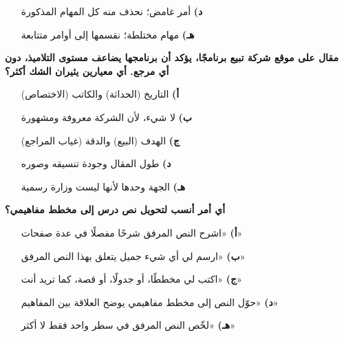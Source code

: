 \documentclass[11pt,a4paper]{article}
\begin{document}
\begin{multicols}{2}
\begin{minipage}{\linewidth}
\begin{itemize}[leftmargin=0.95cm, labelsep=4pt, itemsep=0pt, topsep=2pt, parsep=0pt]
  \item[\textbf{د)}] أمر غامض؛ نحذف منه كل المهام المذكورة
  \item[\textbf{هـ)}] مهام مختلطة؛ نقسمها إلى أوامر متتابعة
\end{itemize}
\end{minipage}\par\vspace{7pt plus 4pt}
\noindent\begin{minipage}{\linewidth}
\hangindent=0.7cm\textbf{مقال على موقع شركة تبيع برنامجًا، يؤكد أن برنامجها يضاعف مستوى التلاميذ، دون أي مرجع. أي معيارين يثيران الشك أكثر؟}
\begin{itemize}[leftmargin=0.95cm, labelsep=4pt, itemsep=0pt, topsep=2pt, parsep=0pt]
  \item[\textbf{أ)}] التاريخ (الحداثة) والكاتب (الاختصاص)
  \item[\textbf{ب)}] لا شيء، لأن الشركة معروفة ومشهورة
  \item[\textbf{ج)}] الهدف (البيع) والدقة (غياب المراجع)
  \item[\textbf{د)}] طول المقال وجودة تنسيقه وصوره
  \item[\textbf{هـ)}] الجهة وحدها لأنها ليست وزارة رسمية
\end{itemize}
\end{minipage}\par\vspace{7pt plus 4pt}
\noindent\begin{minipage}{\linewidth}
\hangindent=0.7cm\textbf{أي أمر أنسب لتحويل نص درس إلى مخطط مفاهيمي؟}
\begin{itemize}[leftmargin=0.95cm, labelsep=4pt, itemsep=0pt, topsep=2pt, parsep=0pt]
  \item[\textbf{أ)}] «اشرح النص المرفق شرحًا مفصلًا في عدة صفحات»
  \item[\textbf{ب)}] «ارسم لي أي شيء جميل يتعلق بهذا النص المرفق»
  \item[\textbf{ج)}] «اكتب لي مخططًا، أو جدولًا، أو قصة، كما تريد أنت»
  \item[\textbf{د)}] «حوّل النص إلى مخطط مفاهيمي يوضح العلاقة بين المفاهيم»
  \item[\textbf{هـ)}] «لخّص النص المرفق في سطر واحد فقط لا أكثر»
\end{itemize}
\end{minipage}\par\vspace{7pt plus 4pt}
\end{multicols}
\end{document}
